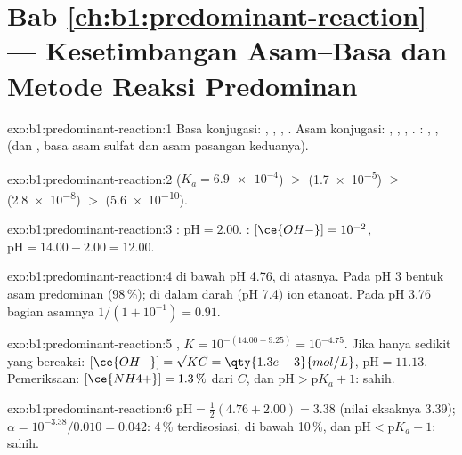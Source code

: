 \section*{Bab \ref{ch:b1:predominant-reaction} --- Kesetimbangan Asam--Basa dan Metode Reaksi Predominan}

\begin{solution}{exo:b1:predominant-reaction:1}
Basa konjugasi: , , , . Asam
konjugasi: , , , . :
, ,  (dan , basa asam sulfat
dan asam pasangan keduanya).
\end{solution}

\begin{solution}{exo:b1:predominant-reaction:2}
 ($K_a = \num{6.9e-4}$) $>$  (\num{1.7e-5}) $>$ 
(\num{2.8e-8}) $>$  (\num{5.6e-10}).
\end{solution}

\begin{solution}{exo:b1:predominant-reaction:3}
: $\mathrm{pH} = 2.00$. : $[\ce{OH-}] = 10^{-2}$,
$\mathrm{pH} = 14.00 - 2.00 = 12.00$.
\end{solution}

\begin{solution}{exo:b1:predominant-reaction:4}
 di bawah pH 4.76,  di atasnya. Pada pH 3 bentuk
asam predominan (98\,\%); di dalam darah (pH 7.4) ion etanoat. Pada
pH 3.76 bagian asamnya $1/(1 + 10^{-1}) = 0.91$.
\end{solution}

\begin{solution}{exo:b1:predominant-reaction:5}
 , $K = 10^{-(14.00 -
9.25)} = 10^{-4.75}$. Jika hanya sedikit  yang bereaksi:
$[\ce{OH-}] = \sqrt{K C} =
\qty{1.3e-3}{mol/L}$, $\mathrm{pH} = 11.13$. Pemeriksaan: $[\ce{NH4+}] = 1.3\,\%$ dari $C$, dan $\mathrm{pH} > \mathrm{p}K_a + 1$: sahih.
\end{solution}

\begin{solution}{exo:b1:predominant-reaction:6}
$\mathrm{pH} = \frac12(4.76 + 2.00) = 3.38$ (nilai eksaknya 3.39);
$\alpha = 10^{-3.38}/0.010 = 0.042$: 4\,\% terdisosiasi, di bawah
10\,\%, dan $\mathrm{pH} < \mathrm{p}K_a - 1$: sahih.
\end{solution}

